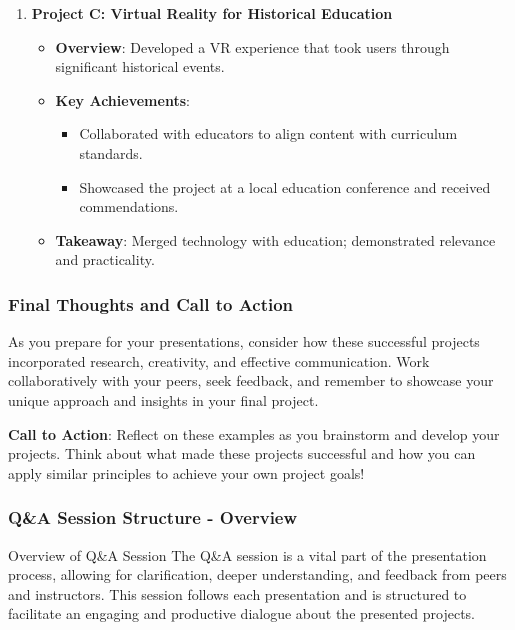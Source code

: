 \documentclass[aspectratio=169]{beamer}
\begin{document}
\begin{frame}[fragile]
\begin{enumerate}
        \item \textbf{Project C: Virtual Reality for Historical Education}
            \begin{itemize}
                \item \textbf{Overview}: Developed a VR experience that took users through significant historical events.
                \item \textbf{Key Achievements}:
                    \begin{itemize}
                        \item Collaborated with educators to align content with curriculum standards.
                        \item Showcased the project at a local education conference and received commendations.
                    \end{itemize}
                \item \textbf{Takeaway}: Merged technology with education; demonstrated relevance and practicality.
            \end{itemize}
    \end{enumerate}
\end{frame}

\begin{frame}[fragile]
    \frametitle{Final Thoughts and Call to Action}
    As you prepare for your presentations, consider how these successful projects incorporated research, creativity, and effective communication. Work collaboratively with your peers, seek feedback, and remember to showcase your unique approach and insights in your final project.

    \textbf{Call to Action}: Reflect on these examples as you brainstorm and develop your projects. Think about what made these projects successful and how you can apply similar principles to achieve your own project goals!
\end{frame}

\begin{frame}[fragile]
    \frametitle{Q\&A Session Structure - Overview}
    \begin{block}{Overview of Q\&A Session}
        The Q\&A session is a vital part of the presentation process, allowing for clarification, deeper understanding, and feedback from peers and instructors. This session follows each presentation and is structured to facilitate an engaging and productive dialogue about the presented projects.
    \end{block}
\end{frame}
\end{document}
